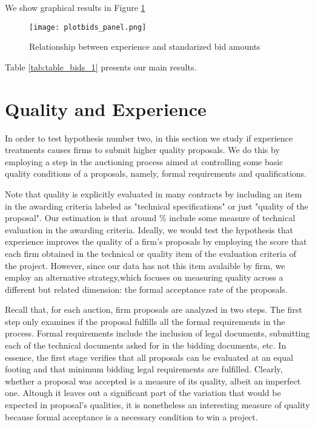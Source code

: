We show graphical results in Figure \ref{fig: plotbids_panel}

\begin{figure}
  \texttt{[image: plotbids\_panel.png]}
  \caption{Relationship between experience and standarized bid amounts}
  \label{fig: plotbids_panel}
\end{figure}



Table \ref{tab:table_bids_1} presents our main results.





\section{Quality and Experience}
In order to test hypothesis number two, in this section we study if experience treatments causes firms to submit higher quality proposals. We do this by employing a step in the auctioning process aimed at controlling some basic quality conditions of a proposals, namely, formal requirements and qualifications.

Note that quality is explicitly evaluated in many contracts by including an item in the awarding criteria labeled as "technical specifications" or just "quality of the proposal". Our estimation is that around \% include some measure of technical evaluation in the awarding criteria.  Ideally, we would test the hypothesis that experience improves the quality of a firm's proposals by employing the score that each firm obtained in the technical or quality item of the evaluation criteria of the project. However, since our data has not this item avalaible by firm, we employ an alternative strategy,which focuses on measuring quality across a different but related dimension: the formal acceptance rate of the proposals.

Recall that, for each auction, firm proposals are analyzed in two steps. The first step only examines if the proposal fulfills all the formal requirements in the process. Formal requirements include the inclusion of legal documents, submitting each of the technical documents asked for in the bidding documents, etc. In essence, the first stage verifies that all proposals can be evaluated at an equal footing and that minimum bidding legal requirements are fulfilled. Clearly, whether a proposal was accepted is a measure of its quality, albeit an imperfect one. Altough it leaves out a significant part of the variation that would be expected in proposal's qualities, it is nonetheless an interesting measure of quality because formal acceptance is a necessary condition to win a project.

